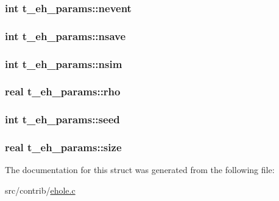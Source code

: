 \hypertarget{structt__eh__params_af723b0dbcc101c878beb7f06fb91c97f}{
\subsubsection[{nevent}]{\setlength{\rightskip}{0pt plus 5cm}int {\bf t\-\_\-eh\-\_\-params\-::nevent}}}\label{structt__eh__params_af723b0dbcc101c878beb7f06fb91c97f}
\hypertarget{structt__eh__params_a41ece27e3eba52ae5d76a823326e0011}{
\subsubsection[{nsave}]{\setlength{\rightskip}{0pt plus 5cm}int {\bf t\-\_\-eh\-\_\-params\-::nsave}}}\label{structt__eh__params_a41ece27e3eba52ae5d76a823326e0011}
\hypertarget{structt__eh__params_a67c791b67efb788568ae41fb700cd01e}{
\subsubsection[{nsim}]{\setlength{\rightskip}{0pt plus 5cm}int {\bf t\-\_\-eh\-\_\-params\-::nsim}}}\label{structt__eh__params_a67c791b67efb788568ae41fb700cd01e}
\hypertarget{structt__eh__params_a36f43a492b90dcc906b979b080ad4f04}{
\subsubsection[{rho}]{\setlength{\rightskip}{0pt plus 5cm}real {\bf t\-\_\-eh\-\_\-params\-::rho}}}\label{structt__eh__params_a36f43a492b90dcc906b979b080ad4f04}
\hypertarget{structt__eh__params_a4cac9bc411e9ea7d8f0b86f2b8c69239}{
\subsubsection[{seed}]{\setlength{\rightskip}{0pt plus 5cm}int {\bf t\-\_\-eh\-\_\-params\-::seed}}}\label{structt__eh__params_a4cac9bc411e9ea7d8f0b86f2b8c69239}
\hypertarget{structt__eh__params_a0ce36d56f0bf11f3c25f88d6a118ea62}{
\subsubsection[{size}]{\setlength{\rightskip}{0pt plus 5cm}real {\bf t\-\_\-eh\-\_\-params\-::size}}}\label{structt__eh__params_a0ce36d56f0bf11f3c25f88d6a118ea62}


\-The documentation for this struct was generated from the following file\-:\begin{DoxyCompactItemize}
\item 
src/contrib/\hyperlink{ehole_8c}{ehole.\-c}\end{DoxyCompactItemize}

